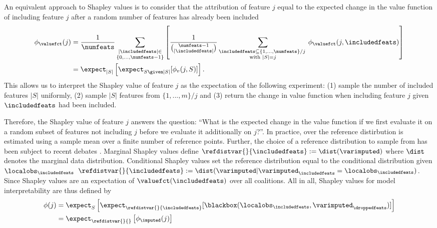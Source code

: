 \documentclass[nohyperref]{article}
\theoremstyle{plain}
\theoremstyle{definition}
\theoremstyle{remark}
\begin{document}
An equivalent approach to Shapley values is to consider that the attribution of feature $j$ equal to the expected change in the value function of including feature $j$ after a random number of features has already been included 
\vspace*{-0.3cm}
\begin{align*}
    \phi_{\valuefct}(j) 
    &=   \frac{1}{\numfeats} \sum_{\substack{|\includedfeats|\in \\ \{0,\ldots,\numfeats-1\}}} \left[\frac{1}{\binom{\numfeats-1}{|\includedfeats|}} \sum_{\substack{\includedfeats\subseteq \{1,\ldots,\numfeats\}/j\; \\\text{with }|S|=j}} \phi_{\valuefct}(j, \includedfeats)\right] \\
    &=  \expect_{|S|}\left[\expect_{S\given |S|}[\phi_{v}(j, S)]\right]. 
\end{align*}
This allows us to interpret the Shapley value of feature $j$ as the expectation of the following experiment: (1) sample the number of included features $|S|$ uniformly, (2) sample $|S|$ features from $\{1,...,m\}/j$ and (3) return the change in value function when including feature $j$ given $\includedfeats$ had been included.

Therefore, the Shapley value of feature $j$ answers the question: ``What is the {expected change} in the value function if we first evaluate it on a random subset of features not including $j$ before we evaluate it additionally on $j$?''. In practice, over the reference distirbution is estimated using a sample mean over a finite number of reference points. Further, the choice of a reference distribution to sample from has been subject to recent debates \cite{aas2019explaining, janzing2020feature, merrick2020explanation}. Marginal Shapley values \cite{lundberg2017unified, janzing2020feature} define $\refdistvar{}{\includedfeats}:=\dist({\varimputed})$ where $\dist$ denotes the marginal data distribution. Conditional Shapley values \cite{aas2019explaining} set the reference distribution equal to the conditional distribution given $\localobs_{\includedfeats}$ $\refdistvar{}{\includedfeats}:=\dist({\varimputed|\varimputed_{\includedfeats}=\localobs_{\includedfeats}})$. Since Shapley values are an expectation of $\valuefct(\includedfeats)$ over all coalitions. All in all, Shapley values for model interpretability are thus defined by 
\vspace*{-0.3cm}
\begin{align*}
    \phi(j) &= \expect_{S}\left[\expect_{\refdistvar{}{\includedfeats}}[\blackbox({\localobs_{\includedfeats}, \varimputed_{\droppedfeats}})]\right] \\
    & =\expect_{\refdistvar{}{}}\left[\phi_{\imputed}(j)\right]
\end{align*}
\end{document}
